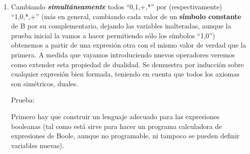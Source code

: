 \documentclass[
]{article}
\begin{document}
\begin{enumerate}
\begin{enumerate}
\begin{enumerate}
      \begin{enumerate}
      \def\labelenumiv{\arabic{enumiv}.}
      \item
        Cambiando \emph{\textbf{simultáneamente}} todos ``0,1,+,*'' por
        (respectivamente) ``1,0,*,+'' (más en general, cambiando cada
        valor de un \textbf{símbolo constante} de B por su
        complementario, dejando las variables inalteradas, aunque la
        prueba inicial la vamos a hacer permitiendo sólo los símbolos
        ``1,0'') obtenemos a partir de una ex\-presión otra con el mismo
        valor de verdad que la primera. A medida que vaya\-mos
        introduciendo nuevos operadores veremos como extender esta
        propiedad de dualidad. Se demuestra por inducción sobre
        cualquier expresión bien formada, teniendo en cuenta que todos
        los axiomas son simétricos, duales.

        Prueba:

        Primero hay que construir un lenguaje adecuado para las
        expresiones booleanas (tal como está sirve para hacer un
        programa calculadora de expresiones de Boo\-le, aunque no
        programable, ni tampoco se pueden definir variables nuevas).


\end{enumerate}
\end{enumerate}
\end{enumerate}
\end{enumerate}
\end{document}
